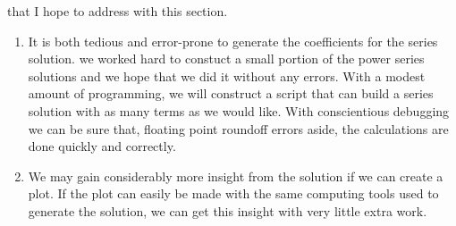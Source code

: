  that I hope to address with this section.  
\begin{enumerate}
\item It is both tedious and error-prone to generate the coefficients for the series solution.  we worked hard to constuct a small portion of the power series solutions and we hope that we did it without any errors.  With a modest amount of programming, we will construct a script that can build a series solution with as many terms as we would like.  With conscientious debugging we can be sure that, floating point roundoff errors aside, the calculations are done quickly and correctly.  

\item We may gain considerably more insight from the solution if we can create a plot.  If the plot can easily be made with the same computing tools used to generate the solution, we can get this insight with very little extra work.
\end{enumerate}


